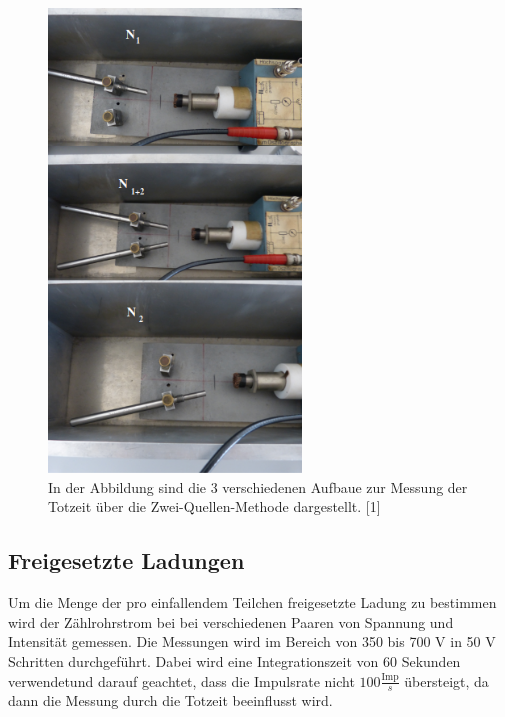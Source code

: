 \documentclass[titlepage = firstcover]{scrartcl}
\begin{document}
                \begin{figure}[h]
                  \centering
                  \includegraphics[width = 0.6\textwidth]{Bilder/zweischema.png}
                  \caption{In der Abbildung sind die 3 verschiedenen Aufbaue zur Messung der Totzeit über die Zwei-Quellen-Methode dargestellt. [1]}
                  \label{fig:zweischema}
                \end{figure}
            
               \FloatBarrier
               \noindent
            
        
        \subsection{Freigesetzte Ladungen}
            Um die Menge der pro einfallendem Teilchen freigesetzte Ladung zu bestimmen wird der Zählrohrstrom bei bei verschiedenen Paaren von Spannung und Intensität gemessen. Die Messungen wird 
            im Bereich von 350 bis 700 V in 50 V Schritten durchgeführt. Dabei wird eine Integrationszeit von 60 Sekunden verwendetund darauf geachtet, dass die Impulsrate nicht 
            $100 \frac{\text{Imp}}{s}$ übersteigt, da dann die Messung durch die Totzeit beeinflusst wird. 
            
\end{document}
